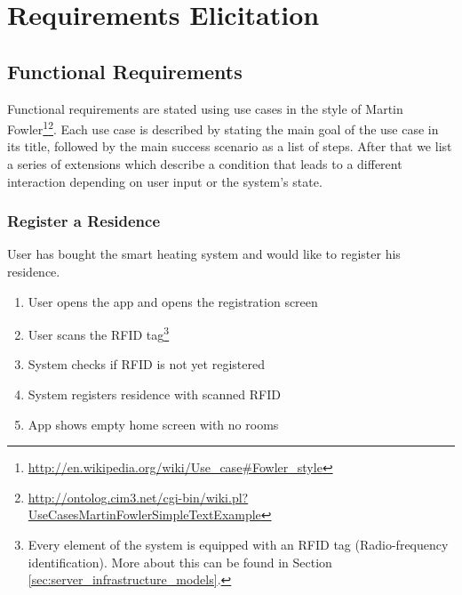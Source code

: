 
\chapter{Requirements Elicitation}
\label{sec:requirements}

\section{Functional Requirements}

Functional requirements are stated using use cases in the style of Martin Fowler\footnote{\url{http://en.wikipedia.org/wiki/Use_case\#Fowler_style}}\footnote{\url{http://ontolog.cim3.net/cgi-bin/wiki.pl?UseCasesMartinFowlerSimpleTextExample}}. Each use case is described by stating the main goal of the use case in its title, followed by the main success scenario as a list of steps. After that we list a series of extensions which describe a condition that leads to a different interaction depending on user input or the system's state.


\subsection{Register a Residence}
User has bought the smart heating system and would like to register his residence.
\begin{enumerate}
    \item User opens the app and opens the registration screen
    \item User scans the RFID tag\footnote{Every element of the system is equipped with an RFID tag (Radio-frequency identification). More about this can be found in Section \ref{sec:server_infrastructure_models}.}
    \item System checks if RFID is not yet registered
    \item System registers residence with scanned RFID
    \item App shows empty home screen with no rooms
\end{enumerate}

